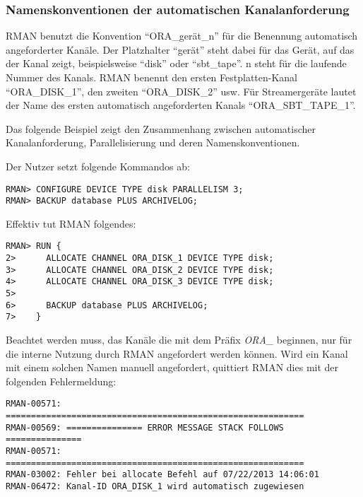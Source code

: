         \subsubsection{Namenskonventionen der automatischen Kanalanforderung}
          RMAN benutzt die Konvention \enquote{ORA\_gerät\_n} für die Benennung automatisch angeforderter Kanäle. Der Platzhalter \enquote{gerät} steht dabei für das Gerät, auf das der Kanal zeigt, beispielsweise \enquote{disk} oder \enquote{sbt\_tape}. n steht für die laufende Nummer des Kanals. RMAN benennt den ersten Festplatten-Kanal \enquote{ORA\_DISK\_1}, den zweiten \enquote{ORA\_DISK\_2} usw. Für Streamergeräte lautet der Name des ersten automatisch angeforderten Kanals \enquote{ORA\_SBT\_TAPE\_1}.

          Das folgende Beispiel zeigt den Zusammenhang zwischen automatischer Kanalanforderung, Parallelisierung und deren Namenskonventionen.

          Der Nutzer setzt folgende Kommandos ab:
          \begin{lstlisting}[caption={Namenskonventionen für RMAN-Kanäle},label=admin1022,language=rman]
RMAN> CONFIGURE DEVICE TYPE disk PARALLELISM 3;
RMAN> BACKUP database PLUS ARCHIVELOG;
          \end{lstlisting}
          Effektiv tut RMAN folgendes:
          \begin{lstlisting}[caption={Namenskonventionen für vordefinierte RMAN-Kanäle 2},label=admin1023,language=rman]
RMAN> RUN {
2>      ALLOCATE CHANNEL ORA_DISK_1 DEVICE TYPE disk;
3>      ALLOCATE CHANNEL ORA_DISK_2 DEVICE TYPE disk;
4>      ALLOCATE CHANNEL ORA_DISK_3 DEVICE TYPE disk;
5>
6>      BACKUP database PLUS ARCHIVELOG;
7>    }
          \end{lstlisting}
\clearpage
          \begin{merke}
            Beachtet werden muss, das Kanäle die mit dem Präfix \textit{ORA\_} beginnen, nur für die interne Nutzung durch RMAN angefordert werden können. Wird ein Kanal mit einem solchen Namen manuell angefordert, quittiert RMAN dies mit der folgenden Fehlermeldung:
\begin{verbatim}
RMAN-00571: ===========================================================
RMAN-00569: =============== ERROR MESSAGE STACK FOLLOWS ===============
RMAN-00571: ===========================================================
RMAN-03002: Fehler bei allocate Befehl auf 07/22/2013 14:06:01
RMAN-06472: Kanal-ID ORA_DISK_1 wird automatisch zugewiesen
\end{verbatim}
          \end{merke}
